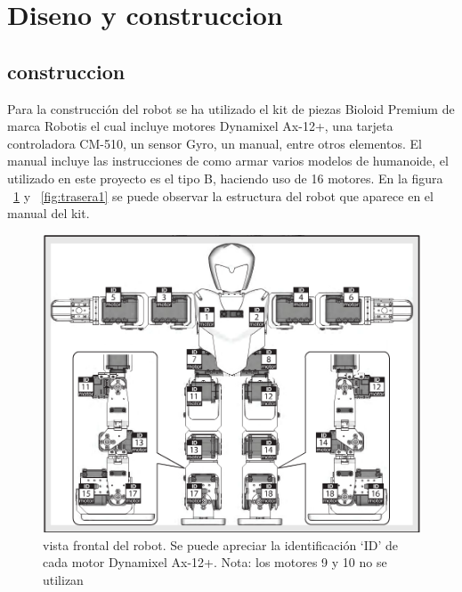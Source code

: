 
\label{chapter:diseno}
\section{Diseno y construccion}
\subsection{construccion}
Para la construcción del robot se ha utilizado el kit de piezas Bioloid Premium de marca Robotis el cual incluye motores Dynamixel Ax-12+, una tarjeta controladora CM-510, un sensor Gyro, un manual, entre otros elementos. El manual incluye las instrucciones de como armar varios modelos de humanoide, el utilizado en este proyecto es el tipo B, haciendo uso de 16 motores. En la figura ~\ref{fig:frontal} y ~\ref{fig:trasera1} se puede observar la estructura del robot que aparece en el manual del kit. 

\begin{figure}[hbtp]
\centering
\includegraphics[scale=0.3]{imagenes/Robot.png}
\caption{vista frontal del robot. Se puede apreciar la identificación ‘ID’ de cada motor Dynamixel Ax-12+. Nota: los motores 9 y 10 no se utilizan}
\label{fig:frontal}
\end{figure}

